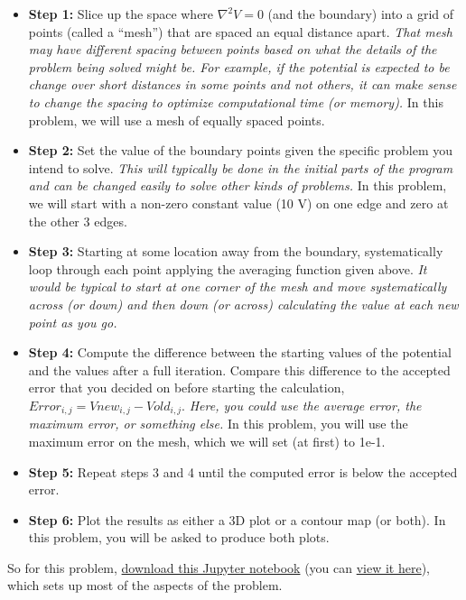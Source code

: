 \documentclass[11pt]{article}
\def\tightlist{}
\begin{document}
\begin{itemize}
\tightlist
\item
  \textbf{Step 1:} Slice up the space where \(\nabla^2 V = 0\) (and the
  boundary) into a grid of points (called a ``mesh'') that are spaced an
  equal distance apart. \emph{That mesh may have different spacing
  between points based on what the details of the problem being solved
  might be. For example, if the potential is expected to be change over
  short distances in some points and not others, it can make sense to
  change the spacing to optimize computational time (or memory).} In
  this problem, we will use a mesh of equally spaced points.
\item
  \textbf{Step 2:} Set the value of the boundary points given the
  specific problem you intend to solve. \emph{This will typically be
  done in the initial parts of the program and can be changed easily to
  solve other kinds of problems.} In this problem, we will start with a
  non-zero constant value (10 V) on one edge and zero at the other 3
  edges.
\item
  \textbf{Step 3:} Starting at some location away from the boundary,
  systematically loop through each point applying the averaging function
  given above. \emph{It would be typical to start at one corner of the
  mesh and move systematically across (or down) and then down (or
  across) calculating the value at each new point as you go.}
\item
  \textbf{Step 4:} Compute the difference between the starting values of
  the potential and the values after a full iteration. Compare this
  difference to the accepted error that you decided on before starting
  the calculation, \(Error_{i,j} = Vnew_{i,j}-Vold_{i,j}\). \emph{Here,
  you could use the average error, the maximum error, or something
  else.} In this problem, you will use the maximum error on the mesh,
  which we will set (at first) to 1e-1.
\item
  \textbf{Step 5:} Repeat steps 3 and 4 until the computed error is
  below the accepted error.
\item
  \textbf{Step 6:} Plot the results as either a 3D plot or a contour map
  (or both). In this problem, you will be asked to produce both plots.
\end{itemize}

So for this problem,
\href{../jupyter/HW6-MethodOfRelaxation.ipynb}{download this Jupyter
notebook} (you can
\href{https://github.com/dannycab/phy481msu/blob/gh-pages/jupyter/HW6-MethodOfRelaxation.ipynb}{view
it here}), which sets up most of the aspects of the problem.
\end{document}

